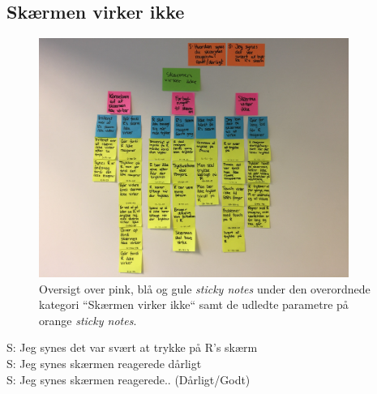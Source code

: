 \subsection{Skærmen virker ikke}
%
\begin{figure}[H]
\centering
\includegraphics[width = 0.9\textwidth]{Figure/AffinityDiagram/SkaermenVirkerIkke} 
\caption{Oversigt over pink, blå og gule \textit{sticky notes} under den overordnede kategori ``Skærmen virker ikke`` samt de udledte parametre på orange \textit{sticky notes}.}
\label{fig:AFSkaermVirkerIkke}
\end{figure}
\noindent
%
S: Jeg synes det var svært at trykke på R's skærm\\
S: Jeg synes skærmen reagerede dårligt\\
S: Jeg synes skærmen reagerede.. (Dårligt/Godt)
%
